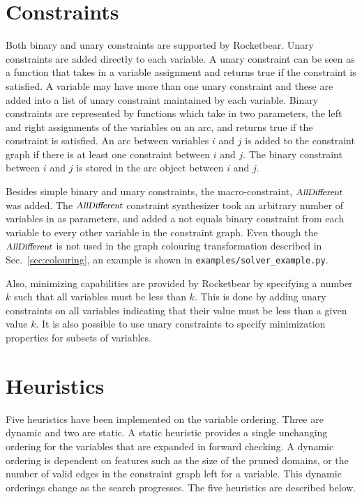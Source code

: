 \documentclass{article}
\newcommand{\Var}[1]{\ensuremath{{\small{\textsl{#1}}}}}
\begin{document}
\section{Constraints}

Both binary and unary constraints are supported by Rocketbear. Unary
constraints are added directly to each variable. A unary constraint can be seen
as a function that takes in a variable assignment and returns true if the
constraint is satisfied. A variable may have more than one unary constraint and
these are added into a list of unary constraint maintained by each variable.
Binary constraints are represented by functions which take in two parameters,
the left and right assignments of the variables on an arc, and returns true if
the constraint is satisfied. An arc between variables $i$ and $j$ is added to
the constraint graph if there is at least one constraint between $i$ and $j$.
The binary constraint between $i$ and $j$ is stored in the arc object between
$i$ and $j$.

Besides simple binary and unary constraints, the macro-constraint,
$\Var{AllDifferent}$ was added. The $\Var{AllDifferent}$ constraint synthesizer
took an arbitrary number of variables in as parameters, and added a not equals
binary constraint from each variable to every other variable in the constraint
graph. Even though the $\Var{AllDifferent}$ is not used in the graph colouring
transformation described in Sec.~\ref{sec:colouring}, an example is shown in
\verb|examples/solver_example.py|.

Also, minimizing capabilities are provided by Rocketbear by specifying a number
$k$ such that all variables must be less than $k$. This is done by adding unary
constraints on all variables indicating that their value must be less than a
given value $k$. It is also possible to use unary constraints to specify
minimization properties for subsets of variables.

\section{Heuristics}

Five heuristics have been implemented on the variable ordering.  Three are
dynamic and two are static. A static heuristic provides a single unchanging
ordering for the variables that are expanded in forward checking. A dynamic
ordering is dependent on features such as the size of the pruned domains, or
the number of valid edges in the constraint graph left for a variable. This
dynamic orderings change as the search progresses. The five heuristics are
described below.
\end{document}
